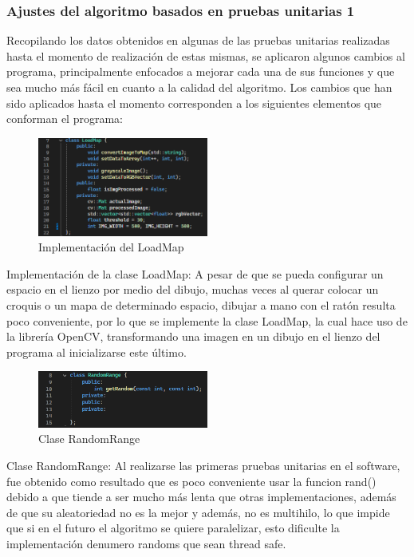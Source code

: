 \subsubsection{Ajustes del algoritmo basados en pruebas unitarias 1}
    Recopilando los datos obtenidos en algunas de las pruebas
        unitarias realizadas hasta el momento de realizaci\'on de estas
        mismas, se aplicaron algunos cambios al programa,
        principalmente enfocados a mejorar cada una de sus
        funciones y que sea mucho m\'as f\'acil en cuanto a la calidad
        del algoritmo.
        \vskip 0.5cm
    Los cambios que han sido aplicados hasta el momento
        corresponden a los siguientes elementos que conforman el
        programa:
        \vskip 0.5cm
    \begin{figure}[htbp]
        \centering
        \includegraphics[width=0.5\textwidth]{./images/Pruebas/simulador/image045.png}
        \caption{Implementaci\'on del LoadMap}
        \label{fig:Prueba unitaria 2}
    \end{figure}
    Implementaci\'on de la clase LoadMap: A pesar de que se
        pueda configurar un espacio en el lienzo por medio del
        dibujo, muchas veces al querar colocar un croquis o un mapa
        de determinado espacio, dibujar a mano con el rat\'on resulta
        poco conveniente, por lo que se implemente la clase
        LoadMap, la cual hace uso de la librer\'ia OpenCV,
        transformando una imagen en un dibujo en el lienzo del
        programa al inicializarse este \'ultimo.
        \vskip 0.5cm
    \begin{figure}[htbp]
        \centering
        \includegraphics[width=0.5\textwidth]{./images/Pruebas/simulador/image046.png}
        \caption{Clase RandomRange}
        \label{fig:Prueba unitaria 3}
    \end{figure}
    Clase RandomRange: Al realizarse las primeras pruebas
        unitarias en el software, fue obtenido como resultado que es
        poco conveniente usar la funcion rand() debido a que tiende
        a ser mucho m\'as lenta que otras implementaciones, adem\'as
        de que su aleatoriedad no es la mejor y adem\'as, no es
        multihilo, lo que impide que si en el futuro el algoritmo se
        quiere paralelizar, esto dificulte la implementaci\'on denumero randoms que sean thread safe.
        \vskip 0.5cm
